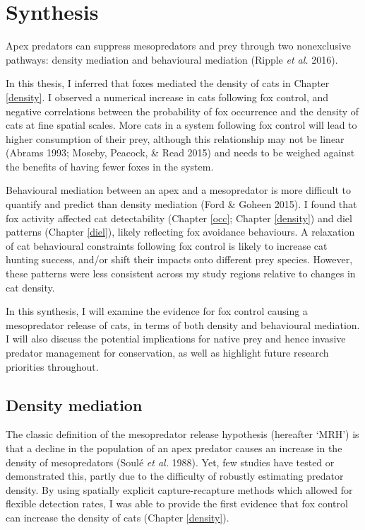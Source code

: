 \documentclass[11pt,a4paper,titlepage,twoside,openright]{style/unimelbthesis}
\begin{document}
\begin{mainmatter}
\hypertarget{synthesis}{%
\chapter{Synthesis}\label{synthesis}}

Apex predators can suppress mesopredators and prey through two nonexclusive pathways: density mediation and behavioural mediation (Ripple \emph{et al.} 2016).

In this thesis, I inferred that foxes mediated the density of cats in Chapter \ref{density}. I observed a numerical increase in cats following fox control, and negative correlations between the probability of fox occurrence and the density of cats at fine spatial scales. More cats in a system following fox control will lead to higher consumption of their prey, although this relationship may not be linear (Abrams 1993; Moseby, Peacock, \& Read 2015) and needs to be weighed against the benefits of having fewer foxes in the system.

Behavioural mediation between an apex and a mesopredator is more difficult to quantify and predict than density mediation (Ford \& Goheen 2015). I found that fox activity affected cat detectability (Chapter \ref{occ}; Chapter \ref{density}) and diel patterns (Chapter \ref{diel}), likely reflecting fox avoidance behaviours. A relaxation of cat behavioural constraints following fox control is likely to increase cat hunting success, and/or shift their impacts onto different prey species. However, these patterns were less consistent across my study regions relative to changes in cat density.

In this synthesis, I will examine the evidence for fox control causing a mesopredator release of cats, in terms of both density and behavioural mediation. I will also discuss the potential implications for native prey and hence invasive predator management for conservation, as well as highlight future research priorities throughout.

\hypertarget{density-mediation}{%
\section{Density mediation}\label{density-mediation}}

The classic definition of the mesopredator release hypothesis (hereafter `MRH') is that a decline in the population of an apex predator causes an increase in the density of mesopredators (Soulé \emph{et al.} 1988). Yet, few studies have tested or demonstrated this, partly due to the difficulty of robustly estimating predator density. By using spatially explicit capture-recapture methods which allowed for flexible detection rates, I was able to provide the first evidence that fox control can increase the density of cats (Chapter \ref{density}).


\end{mainmatter}
\end{document}
